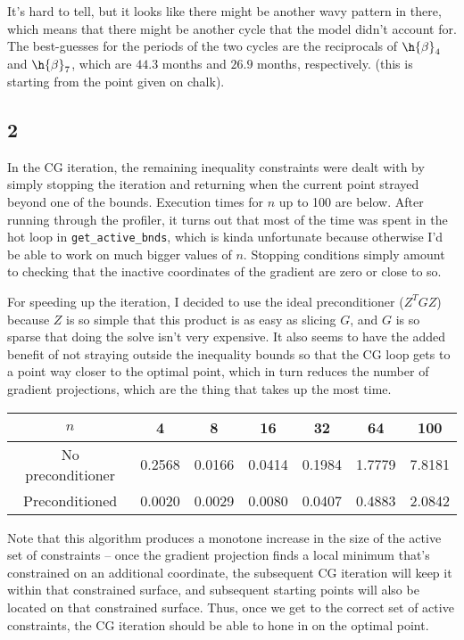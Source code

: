 \documentclass{article}
\begin{document}
It's hard to tell, but it looks like there might be another wavy pattern in there, which means that there might be another cycle that the model didn't account for. The best-guesses for the periods of the two cycles are the reciprocals of $\h{\beta}_4$ and $\h{\beta}_7$, which are $44.3$ months and $26.9$ months, respectively. (this is starting from the point given on chalk).
\subsection*{2}
In the CG iteration, the remaining inequality constraints were dealt with by simply stopping the iteration and returning when the current point strayed beyond one of the bounds. Execution times for $n$ up to 100 are below. After running through the profiler, it turns out that most of the time was spent in the hot loop in \verb|get_active_bnds|, which is kinda unfortunate because otherwise I'd be able to work on much bigger values of $n$. Stopping conditions simply amount to checking that the inactive coordinates of the gradient are zero or close to so.

For speeding up the iteration, I decided to use the ideal preconditioner ($Z^TGZ$) because $Z$ is so simple that this product is as easy as slicing $G$, and $G$ is so sparse that doing the solve isn't very expensive. It also seems to have the added benefit of not straying outside the inequality bounds so that the CG loop gets to a point way closer to the optimal point, which in turn reduces the number of gradient projections, which are the thing that takes up the most time.

\begin{tabular}{c|cccccc}
    $n$&4&8&16&32&64&100\\
    \hline
    No preconditioner&0.2568&0.0166&0.0414&0.1984&1.7779&7.8181\\
    \hline
    Preconditioned&0.0020&0.0029&0.0080&0.0407&0.4883&2.0842\\
\end{tabular}

Note that this algorithm produces a monotone increase in the size of the active set of constraints -- once the gradient projection finds a local minimum that's constrained on an additional coordinate, the subsequent CG iteration will keep it within that constrained surface, and subsequent starting points will also be located on that constrained surface. Thus, once we get to the correct set of active constraints, the CG iteration should be able to hone in on the optimal point. 
\end{document}
